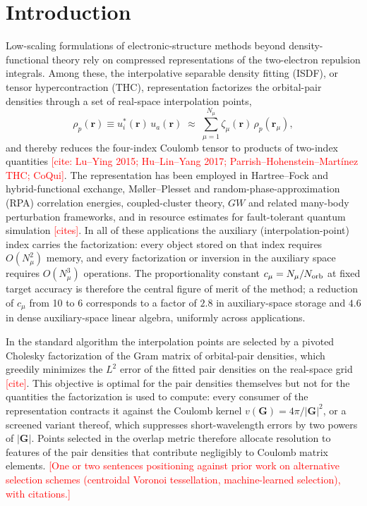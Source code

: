 \documentclass[aps,prb,twocolumn,superscriptaddress,amsmath,amssymb]{revtex4-2}
\newcommand{\Nmu}{N_\mu}
\newcommand{\cmu}{c_\mu}
\newcommand{\rr}{\mathbf{r}}
\newcommand{\GG}{\mathbf{G}}
\newcommand{\todo}[1]{\textcolor{red}{[#1]}}
\begin{document}
\maketitle

\section{Introduction}
\label{sec:intro}

Low-scaling formulations of electronic-structure methods beyond
density-functional theory rely on compressed representations of the
two-electron repulsion integrals. Among these, the interpolative separable
density fitting (ISDF), or tensor hypercontraction (THC), representation
factorizes the orbital-pair densities through a set of real-space
interpolation points,
\begin{equation}
  \rho_p(\rr) \equiv u^{*}_{i}(\rr)\, u_{a}(\rr)
  \;\approx\; \sum_{\mu=1}^{\Nmu} \zeta_\mu(\rr)\, \rho_p(\rr_\mu),
  \label{eq:isdf}
\end{equation}
and thereby reduces the four-index Coulomb tensor to products of two-index
quantities \todo{cite: Lu--Ying 2015; Hu--Lin--Yang 2017;
Parrish--Hohenstein--Mart\'inez THC; CoQui}. The representation has been
employed in Hartree--Fock and hybrid-functional exchange, M{\o}ller--Plesset
and random-phase-approximation (RPA) correlation energies, coupled-cluster
theory, $GW$ and related many-body perturbation frameworks, and in resource
estimates for fault-tolerant quantum simulation \todo{cites}. In all of
these applications the auxiliary (interpolation-point) index carries the
factorization: every object stored on that index requires $O(\Nmu^{2})$
memory, and every factorization or inversion in the auxiliary space requires
$O(\Nmu^{3})$ operations. The proportionality constant
$\cmu = \Nmu/N_{\rm orb}$ at fixed target accuracy is therefore the central
figure of merit of the method; a reduction of $\cmu$ from 10 to 6
corresponds to a factor of $2.8$ in auxiliary-space storage and $4.6$ in
dense auxiliary-space linear algebra, uniformly across applications.

In the standard algorithm the interpolation points are selected by a
pivoted Cholesky factorization of the Gram matrix of orbital-pair densities,
which greedily minimizes the $L^{2}$ error of the fitted pair densities on
the real-space grid \todo{cite}. This objective is optimal for the pair
densities themselves but not for the quantities the factorization is used to
compute: every consumer of the representation contracts it against the
Coulomb kernel $v(\GG) = 4\pi/|\GG|^{2}$, or a screened variant thereof,
which suppresses short-wavelength errors by two powers of $|\GG|$. Points
selected in the overlap metric therefore allocate resolution to features of
the pair densities that contribute negligibly to Coulomb matrix elements.
\todo{One or two sentences positioning against prior work on alternative
selection schemes (centroidal Voronoi tessellation, machine-learned
selection), with citations.}
\end{document}

